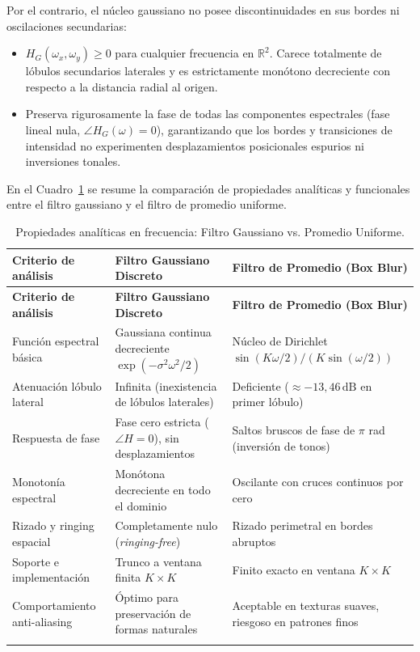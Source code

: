 \documentclass[11pt]{article}
\begin{document}
Por el contrario, el núcleo gaussiano no posee discontinuidades en sus bordes ni oscilaciones secundarias:
\begin{itemize}[itemsep=0.2em]
\item $H_G(\omega_x, \omega_y) \ge 0$ para cualquier frecuencia en $\mathbb{R}^2$. Carece totalmente de lóbulos secundarios laterales y es estrictamente monótono decreciente con respecto a la distancia radial al origen.
\item Preserva rigurosamente la fase de todas las componentes espectrales (fase lineal nula, $\angle H_G(\omega) = 0$), garantizando que los bordes y transiciones de intensidad no experimenten desplazamientos posicionales espurios ni inversiones tonales.
\end{itemize}

En el Cuadro~\ref{tab:comparacion_frecuencial} se resume la comparación de propiedades analíticas y funcionales entre el filtro gaussiano y el filtro de promedio uniforme.

\begin{longtable}{>{\raggedright\arraybackslash}p{3.8cm}>{\raggedright\arraybackslash}p{5.4cm}>{\raggedright\arraybackslash}p{5.4cm}}
\caption{Propiedades analíticas en frecuencia: Filtro Gaussiano vs. Promedio Uniforme.}\\
\toprule
\textbf{Criterio de análisis} & \textbf{Filtro Gaussiano Discreto} & \textbf{Filtro de Promedio (Box Blur)} \\
\midrule\endfirsthead
\toprule
\textbf{Criterio de análisis} & \textbf{Filtro Gaussiano Discreto} & \textbf{Filtro de Promedio (Box Blur)} \\
\midrule\endhead
Función espectral básica & Gaussiana continua decreciente $\exp(-\sigma^2\omega^2/2)$ & Núcleo de Dirichlet $\sin(K\omega/2)/(K\sin(\omega/2))$ \\
\cellcolor{azulClaro!40}Atenuación lóbulo lateral & \cellcolor{azulClaro!40}Infinita (inexistencia de lóbulos laterales) & \cellcolor{azulClaro!40}Deficiente ($\approx -13,46\,\text{dB}$ en primer lóbulo) \\
Respuesta de fase & Fase cero estricta ($\angle H = 0$), sin desplazamientos & Saltos bruscos de fase de $\pi$ rad (inversión de tonos) \\
\cellcolor{azulClaro!40}Monotonía espectral & \cellcolor{azulClaro!40}Monótona decreciente en todo el dominio & \cellcolor{azulClaro!40}Oscilante con cruces continuos por cero \\
Rizado y ringing espacial & Completamente nulo (\textit{ringing-free}) & Rizado perimetral en bordes abruptos \\
\cellcolor{azulClaro!40}Soporte e implementación & \cellcolor{azulClaro!40}Trunco a ventana finita $K\times K$ & \cellcolor{azulClaro!40}Finito exacto en ventana $K\times K$ \\
Comportamiento anti-aliasing & Óptimo para preservación de formas naturales & Aceptable en texturas suaves, riesgoso en patrones finos \\
\bottomrule
\label{tab:comparacion_frecuencial}
\end{longtable}
\end{document}

